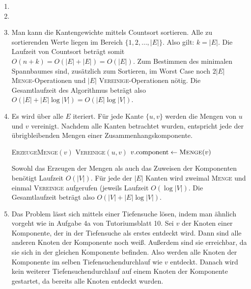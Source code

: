 \documentclass[11pt,a4paper]{article}
\begin{document}
\begin{loesung}
    \begin{enumerate}
        \item 
        \item
        \item Man kann die Kantengewichte mittels Countsort sortieren.
        Alle zu sortierenden Werte liegen im Bereich $\{1, 2, \ldots, |E|\}$.
        Also gilt: $k = |E|$.
        Die Laufzeit von Countsort beträgt somit $O(n + k) = O(|E| + |E|) = O(|E|)$.
        Zum Bestimmen des minimalen Spannbaumes sind, zusätzlich zum Sortieren, im Worst Case noch $2|E|$ \textsc{Menge}-Operationen und $|E|$ \textsc{Vereinige}-Operationen nötig.
        Die Gesamtlaufzeit des Algorithmus beträgt also $O(|E| + |E| \log |V|) = O(|E| \log |V|)$.
        \item
        Es wird über alle $E$ iteriert.
        Für jede Kante $\{u, v\}$ werden die Mengen von $u$ und $v$ vereinigt.
        Nachdem alle Kanten betrachtet wurden, entspricht jede der übrigbleibenden Mengen einer Zusammenhangskomponente.
        \begin{algorithmic}[1]
                    \State \textsc{ErzeugeMenge}$(v)$
                \EndFor
                        \State \textsc{Vereinige}$(u, v)$
                    \EndIf
                \EndFor
                    \State $v.\mathrm{component} \gets \text{\textsc{Menge}}(v)$
                \EndFor
            \EndProcedure
        \end{algorithmic}
        Sowohl das Erzeugen der Mengen als auch das Zuweisen der Komponenten benötigt Laufzeit $O(|V|)$.
        Für jede der $|E|$ Kanten wird zweimal \textsc{Menge} und einmal \textsc{Vereinige} aufgerufen (jeweils Laufzeit $O(\log |V|)$.
        Die Gesamtlaufzeit beträgt also $O(|V| + |E| \log |V|)$.

        \item Das Problem lässt sich mittels einer Tiefensuche lösen, indem man ähnlich vorgeht wie in Aufgabe 4a von Tutoriumsblatt 10.
        Sei $v$ der Knoten einer Komponente, der in der Tiefensuche als erstes entdeckt wird.
        Dann sind alle anderen Knoten der Komponente noch weiß.
        Außerdem sind sie erreichbar, da sie sich in der gleichen Komponente befinden.
        Also werden alle Knoten der Komponente im selben Tiefensuchendurchlauf wie $v$ entdeckt.
        Danach wird kein weiterer Tiefensuchendurchlauf auf einem Knoten der Komponente gestartet, da bereits alle Knoten entdeckt wurden.


\end{enumerate}
\end{loesung}
\end{document}
